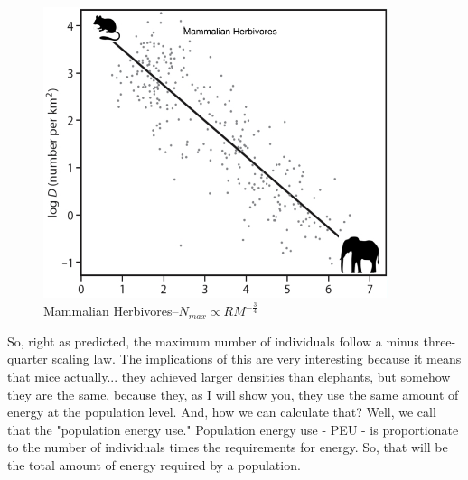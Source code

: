 \documentclass[]{article}
\begin{document}
\begin{figure}[H]
	\caption[Mammalian Herbivores]{Mammalian Herbivores--$N_{max}\propto R M^{-\frac{3}{4}}$\cite{damuth1981population}}\label{fig:MammalianHerbivores}
	\includegraphics[width=0.9\textwidth]{MammalianHerbivores}
\end{figure}	

So, right as predicted,
the maximum number of individuals
follow a minus three-quarter
scaling law.
The implications of this
are very interesting
because it means that mice actually...
they achieved larger densities
than elephants,
but somehow they are the same,
because they, as I will show you,
they use the same amount of energy
at the population level.
And, how we can calculate that?
Well, we call that
the "population energy use."
Population energy use - PEU -
is proportionate to
the number of individuals times
the requirements for energy.
So, that will be the total amount
of energy required by a population.
\end{document}
